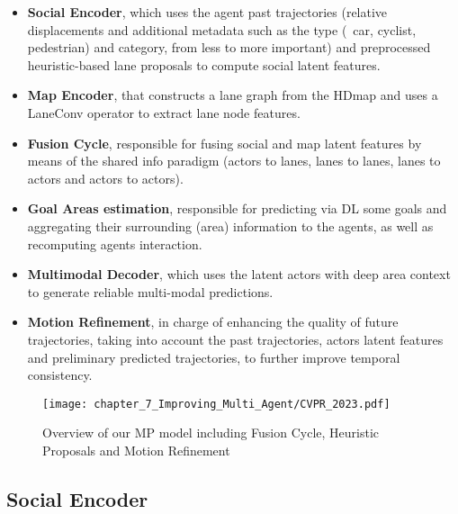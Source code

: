 \begin{itemize}
	
	\item \textbf{Social Encoder}, which uses the agent past trajectories (relative displacements and additional metadata such as the type (\eg \ car, cyclist, pedestrian) and category, from less to more important) and preprocessed heuristic-based lane proposals to compute social latent features.
	
	\item \textbf{Map Encoder}, that constructs a lane graph from the \ac{HDmap} and uses a LaneConv operator \cite{liang2020learning} to extract lane node features.
	
	\item \textbf{Fusion Cycle}, responsible for fusing social and map latent features by means of the shared info paradigm (actors to lanes, lanes to lanes, lanes to actors and actors to actors).
	
	\item \textbf{Goal Areas estimation}, responsible for predicting via \ac{DL} some goals and aggregating their surrounding (area) information to the agents, as well as recomputing agents interaction. 
	
	\item \textbf{Multimodal Decoder}, which uses the latent actors with deep area context to generate reliable multi-modal predictions.
	
	\item \textbf{Motion Refinement}, in charge of enhancing the quality of future trajectories, taking into account the past trajectories, actors latent features and preliminary predicted trajectories, to further improve temporal consistency.
	
\end{itemize}

\begin{figure}[h] 
	\centering
	\texttt{[image: chapter\_7\_Improving\_Multi\_Agent/CVPR\_2023.pdf]}
	\caption{Overview of our \ac{MP} model including Fusion Cycle, Heuristic Proposals and Motion Refinement}
	\label{fig:chapter_7_Improving_Multi_Agent/CVPR_2023}
\end{figure}

\subsection{Social Encoder}
\label{subsec:7_improving_efficiency_social_encoder}

